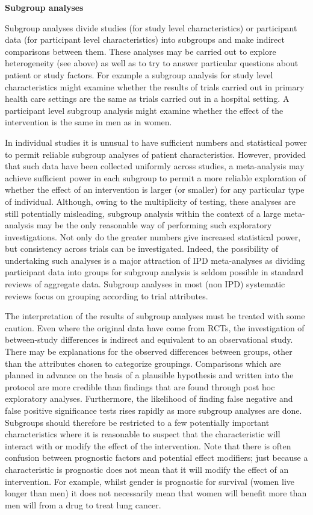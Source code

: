 \documentclass[
  11pt,
  a4paper,
  DIV=11,
  numbers=noendperiod]{scrreprt}
\begin{document}
\textbf{Subgroup analyses}

Subgroup analyses divide studies (for study level characteristics) or
participant data (for participant level characteristics) into subgroups
and make indirect comparisons between them. These analyses may be
carried out to explore heterogeneity (see above) as well as to try to
answer particular questions about patient or study factors. For example
a subgroup analysis for study level characteristics might examine
whether the results of trials carried out in primary health care
settings are the same as trials carried out in a hospital setting. A
participant level subgroup analysis might examine whether the effect of
the intervention is the same in men as in women.

In individual studies it is unusual to have sufficient numbers and
statistical power to permit reliable subgroup analyses of patient
characteristics. However, provided that such data have been collected
uniformly across studies, a meta-analysis may achieve sufficient power
in each subgroup to permit a more reliable exploration of whether the
effect of an intervention is larger (or smaller) for any particular type
of individual. Although, owing to the multiplicity of testing, these
analyses are still potentially misleading, subgroup analysis within the
context of a large meta-analysis may be the only reasonable way of
performing such exploratory investigations. Not only do the greater
numbers give increased statistical power, but consistency across trials
can be investigated. Indeed, the possibility of undertaking such
analyses is a major attraction of IPD meta-analyses as dividing
participant data into groups for subgroup analysis is seldom possible in
standard reviews of aggregate data. Subgroup analyses in most (non IPD)
systematic reviews focus on grouping according to trial attributes.

The interpretation of the results of subgroup analyses must be treated
with some caution. Even where the original data have come from RCTs, the
investigation of between-study differences is indirect and equivalent to
an observational study. There may be explanations for the observed
differences between groups, other than the attributes chosen to
categorize groupings. Comparisons which are planned in advance on the
basis of a plausible hypothesis and written into the protocol are more
credible than findings that are found through post hoc exploratory
analyses. Furthermore, the likelihood of finding false negative and
false positive significance tests rises rapidly as more subgroup
analyses are done. Subgroups should therefore be restricted to a few
potentially important characteristics where it is reasonable to suspect
that the characteristic will interact with or modify the effect of the
intervention. Note that there is often confusion between prognostic
factors and potential effect modifiers; just because a characteristic is
prognostic does not mean that it will modify the effect of an
intervention. For example, whilst gender is prognostic for survival
(women live longer than men) it does not necessarily mean that women
will benefit more than men will from a drug to treat lung cancer.
\end{document}
